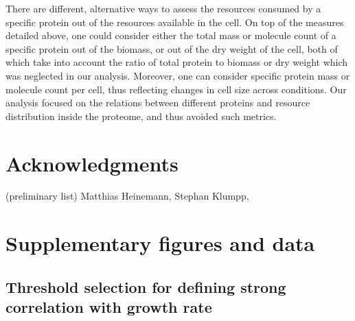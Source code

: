 There are different, alternative ways to assess the resources consumed by a specific protein out of the resources available in the cell.
On top of the measures detailed above, one could consider either the total mass or molecule count of a specific protein out of the biomass, or out of the dry weight of the cell, both of which take into account the ratio of total protein to biomass or dry weight which was neglected in our analysis.
Moreover, one can consider specific protein mass or molecule count per cell, thus reflecting changes in cell size across conditions.
Our analysis focused on the relations between different proteins and resource distribution inside the proteome, and thus avoided such metrics.
\section{Acknowledgments}
(preliminary list) Matthias Heinemann, Stephan Klumpp, 
\section{Supplementary figures and data}
\subsection{Threshold selection for defining strong correlation with growth rate}
\label{corrthreshold} 